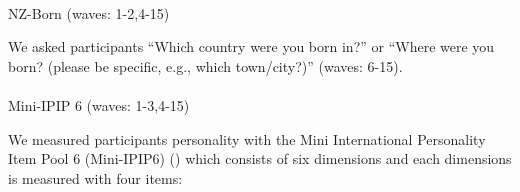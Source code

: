 \documentclass[
  singlecolumn,
  9pt]{scrartcl}
\makeatletter
\let\oldparagraph\paragraph
\renewcommand{\paragraph}{
    \@ifstar
      \xxxParagraphStar
      \xxxParagraphNoStar
  }
\newcommand{\xxxParagraphStar}[1]{\oldparagraph*{#1}\mbox{}}
\newcommand{\xxxParagraphNoStar}[1]{\oldparagraph{#1}\mbox{}}
\makeatother
\begin{document}
\paragraph{NZ-Born (waves: 1-2,4-15)}\label{nz-born-waves-1-24-15}

We asked participants ``Which country were you born in?'' or ``Where
were you born? (please be specific, e.g., which town/city?)'' (waves:
6-15).

\paragraph{Mini-IPIP 6 (waves:
1-3,4-15)}\label{mini-ipip-6-waves-1-34-15}

We measured participants personality with the Mini International
Personality Item Pool 6 (Mini-IPIP6) () which consists of six dimensions and each
dimensions is measured with four items:
\end{document}
